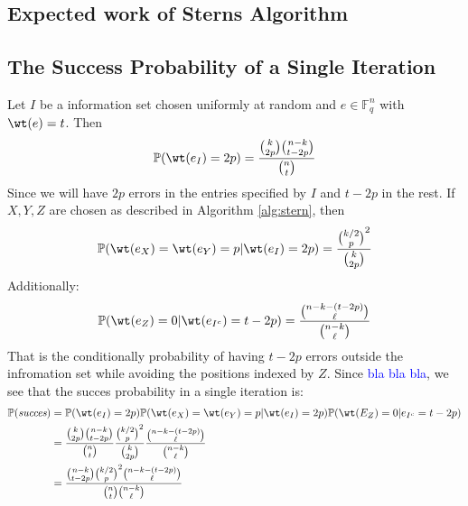 \subsection{Expected work of Sterns Algorithm}%

\subsection{The Success Probability of a Single Iteration}%
Let $I$ be a information set chosen uniformly at random and $e \in \mathbb{F}_q^n$ with $\wt(e) = t$. Then
\begin{equation*}
  \mathbb{P}(\wt(e_I) = 2p) = \frac{\binom{k}{2p}\binom{n - k}{t - 2p}}{\binom{n}{t}}
\end{equation*}
Since we will have $2p$ errors in the entries specified by $I$ and $t - 2p$ in the rest. If $X,Y, Z$ are chosen as described in Algorithm \ref{alg:stern}, then
\begin{equation*}
  \mathbb{P}(\wt(e_X) = \wt(e_Y) = p | \wt(e_I) = 2p) = \frac{\binom{k / 2}{p}^{2}}{\binom{k}{2p}}
\end{equation*}
Additionally:
\begin{equation*}
  \mathbb{P}(\wt(e_Z) = 0 | \wt(e_{I^c}) = t - 2p) = \frac{\binom{n - k - (t - 2p)}{\ell}}{\binom{n - k}{\ell}}
\end{equation*}
That is the conditionally probability of having $t - 2p$ errors outside the infromation set while avoiding the positions indexed by $Z$. Since \textcolor{blue}{bla bla bla}, we see that the succes probability in a single iteration is:
\begin{align*}
  \mathbb{P}(\textit{succes}) &= \mathbb{P}(\wt(e_I) = 2p) \mathbb{P}(\wt(e_X)=\wt(e_Y) = p | \wt(e_I) = 2p) \mathbb{P}(\wt(E_Z) = 0 | e_{I^c} = t - 2p) \\
  &= \frac{\binom{k}{2p}\binom{n - k}{t - 2p}}{\binom{n}{t}} \frac{\binom{k / 2}{p}^{2}}{\binom{k}{2p}} \frac{\binom{n - k - (t - 2p)}{\ell}}{\binom{n - k}{\ell}} \\
  &= \frac{\binom{n - k}{t - 2p}\binom{k / 2}{p}^{2}\binom{n - k - (t - 2p)}{\ell}}{\binom{n}{t}\binom{n - k}{\ell}}
\end{align*}
